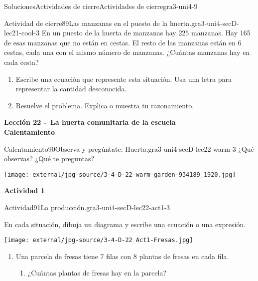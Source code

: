 \documentclass[twoside,10pt,]{article}
\begin{document}
\begin{solutions-section}{Soluciones}{Actividades de cierre}{}{Actividades de cierre}{}{}{gra3-uni4-9}
\begin{projectsolution}{Actividad de cierre}{89}{Las manzanas en el puesto de la huerta.}{gra3-uni4-secD-lec21-cool-3}%
En un puesto de la huerta de manzanas hay \(225\) manzanas. Hay 165 de esas manzanas que no están en cestas. El resto de las manzanas están en \(6\) cestas, cada una con el mismo número de manzanas. ¿Cuántas manzanas hay en cada cesta?%
%
\begin{enumerate}
\item{}Escribe una ecuación que represente esta situación. Usa una letra para representar la cantidad desconocida.%
\item{}Resuelve el problema. Explica o muestra tu razonamiento.%
\end{enumerate}
\end{projectsolution}%
\par\medskip
\noindent\textbf{\large{}\space\textperiodcentered\space{}Lección 22 -~La huerta comunitaria de la escuela\\
\space\textperiodcentered\space{}Calentamiento}
\begin{explorationsolution}{Calentamiento}{90}{Observa y pregúntate: Huerta.}{gra3-uni4-secD-lec22-warm-3}%
¿Qué observas? ¿Qué te preguntas?%
\begin{image}{0.125}{0.75}{0.125}{}%
\texttt{[image: external/jpg-source/3-4-D-22-warm-garden-934189\_1920.jpg]}
\end{image}%
\end{explorationsolution}%
\par\medskip
\noindent\textbf{\large{}\space\textperiodcentered\space{}Actividad 1}
\begin{activitysolution}{Actividad}{91}{La producción.}{gra3-uni4-secD-lec22-act1-3}%
\begin{sidebyside}{2}{0}{0}{0}%
\begin{sbspanel}{0.5}%
En cada situación, dibuja un diagrama y escribe una ecuación o una expresión.%
\end{sbspanel}%
\begin{sbspanel}{0.5}%
\texttt{[image: external/jpg-source/3-4-D-22 Act1-Fresas.jpg]}
\end{sbspanel}%
\end{sidebyside}%
%
\begin{enumerate}
\item{}Una parcela de fresas tiene \(7\) filas con \(8\) plantas de fresas en cada fila.%
%
\begin{enumerate}
\item{}¿Cuántas plantas de fresas hay en la parcela?%

\end{enumerate}
\end{enumerate}
\end{activitysolution}
\end{solutions-section}
\end{document}
